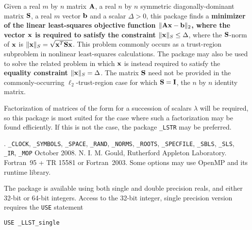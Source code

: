\documentclass{galahad}
\newcommand{\packagename}{LLST}
\newcommand{\fullpackagename}{\libraryname\_\packagename}
\begin{document}
\galheader


\galsummary
Given a real $m$ by $n$ matrix ${\mathbf{A}}$,
a real $n$ by $n$ symmetric diagonally-dominant matrix ${\mathbf{S}}$,
a real $m$ vector ${\mathbf{b}}$ and a scalar $\Delta>0$, this package finds a
{\bf minimizer of the linear least-squares objective function
$\| {\mathbf{A}} {\mathbf{x}}  - {\mathbf{b}} \|_2$, where the vector ${\mathbf{x}}$ is
required to satisfy the constraint $\|{\mathbf{x}}\|_S \leq  \Delta$},
where the ${\mathbf{S}}$-norm of ${\mathbf{x}}$ is $\|{\mathbf{x}}\|_S = \sqrt{{\mathbf{x}}^T {\mathbf{S}} {\mathbf{x}}}$.
This problem commonly occurs as a trust-region subproblem in nonlinear
least-squares calculations.
The package may also be used to solve the related problem in which ${\mathbf{x}}$ is
instead required to satisfy the
{\bf equality constraint $\|{\mathbf{x}}\|_S = \Delta$}.
The matrix ${\mathbf{S}}$ need not be provided in the commonly-occurring
$\ell_2$-trust-region case for which ${\mathbf{S}} = {\mathbf{I}}$, the $n$ by $n$
identity matrix.

\noindent
Factorization of matrices of the form
for a succession
of scalars $\lambda$ will be required, so this package is most suited
for the case where such a factorization may be found efficiently. If
this is not the case, the package {\tt \libraryname\_LSTR} may be preferred.



\galattributes
\galversions{\tt  \fullpackagename\_single, \fullpackagename\_double}.
\galuses
{\tt \libraryname\_CLOCK},
{\tt \libraryname\_SY\-M\-BOLS},
{\tt \libraryname\_SPACE}, {\tt \libraryname\_\-RAND},
{\tt \libraryname\_\-NORMS},
{\tt \libraryname\_ROOTS}, {\tt \libraryname\_SPECFILE},
{\tt \libraryname\_SBLS},
{\tt \libraryname\_SLS}, {\tt \libraryname\_IR},
{\tt \libraryname\_MOP}
\galdate October 2008.
\galorigin N. I. M. Gould, Rutherford Appleton Laboratory.
\gallanguage Fortran~95 + TR 15581 or Fortran~2003.
\galparallelism Some options may use OpenMP and its runtime library.


\galhowto

The package is available using both single and double precision reals, 
and either 32-bit or 64-bit integers. Access to the 32-bit integer,
single precision version requires the {\tt USE} statement
\medskip

\hspace{8mm} {\tt USE \fullpackagename\_single}
\end{document}
